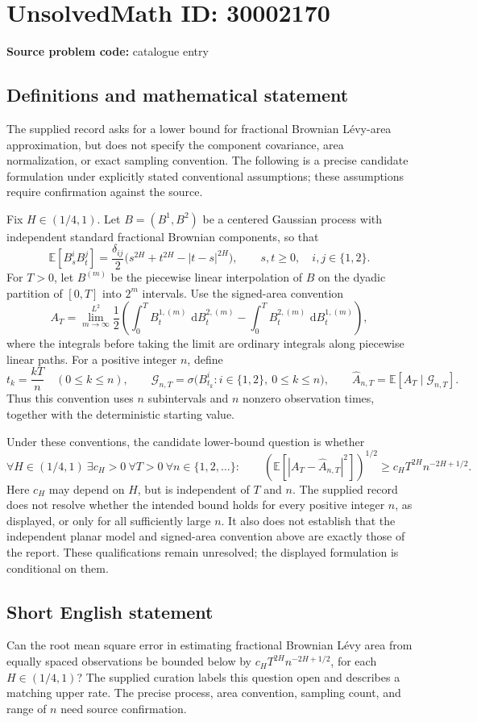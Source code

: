 \documentclass[11pt]{article}
\newcommand{\E}{\mathbb{E}}
\newcommand{\dd}{\,\mathrm{d}}
\begin{document}
\section*{UnsolvedMath ID: 30002170}
\textbf{Source problem code:} catalogue entry
\subsection{Definitions and mathematical statement}
The supplied record asks for a lower bound for fractional Brownian L\'evy-area approximation, but does not specify the component covariance, area normalization, or exact sampling convention. The following is a precise candidate formulation under explicitly stated conventional assumptions; these assumptions require confirmation against the source.

Fix \(H\in(1/4,1)\). Let \(B=(B^1,B^2)\) be a centered Gaussian process with independent standard fractional Brownian components, so that
\[
\E[B^i_sB^j_t]=\frac{\delta_{ij}}2\bigl(s^{2H}+t^{2H}-|t-s|^{2H}\bigr),\qquad s,t\geq0,\quad i,j\in\{1,2\}.
\]
For \(T>0\), let \(B^{(m)}\) be the piecewise linear interpolation of \(B\) on the dyadic partition of \([0,T]\) into \(2^m\) intervals. Use the signed-area convention
\[
A_T=\lim_{m\to\infty}^{L^2}\frac12\left(\int_0^T B^{1,(m)}_t\,\dd B^{2,(m)}_t-\int_0^T B^{2,(m)}_t\,\dd B^{1,(m)}_t\right),
\]
where the integrals before taking the limit are ordinary integrals along piecewise linear paths. For a positive integer \(n\), define
\[
t_k=\frac{kT}{n}\quad(0\leq k\leq n),\qquad
\mathcal G_{n,T}=\sigma\bigl(B^i_{t_k}:i\in\{1,2\},\ 0\leq k\leq n\bigr),\qquad
\widehat A_{n,T}=\E[A_T\mid\mathcal G_{n,T}].
\]
Thus this convention uses \(n\) subintervals and \(n\) nonzero observation times, together with the deterministic starting value.

Under these conventions, the candidate lower-bound question is whether
\[
\forall H\in(1/4,1)\ \exists c_H>0\ \forall T>0\ \forall n\in\{1,2,\ldots\}:\qquad
\left(\E\left[|A_T-\widehat A_{n,T}|^2\right]\right)^{1/2}
\geq c_H T^{2H}n^{-2H+1/2}.
\]
Here \(c_H\) may depend on \(H\), but is independent of \(T\) and \(n\). The supplied record does not resolve whether the intended bound holds for every positive integer \(n\), as displayed, or only for all sufficiently large \(n\). It also does not establish that the independent planar model and signed-area convention above are exactly those of the report. These qualifications remain unresolved; the displayed formulation is conditional on them.
\subsection{Short English statement}
Can the root mean square error in estimating fractional Brownian L\'evy area from equally spaced observations be bounded below by \(c_HT^{2H}n^{-2H+1/2}\), for each \(H\in(1/4,1)\)? The supplied curation labels this question open and describes a matching upper rate. The precise process, area convention, sampling count, and range of \(n\) need source confirmation.
\end{document}
